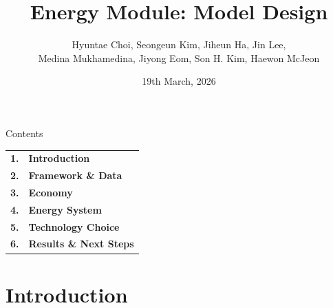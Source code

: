 \documentclass[aspectratio=169, 10pt]{beamer}
\title{Energy Module: Model Design}
\author{Hyuntae Choi, Seongeun Kim, Jiheun Ha, Jin Lee, \\[4pt] Medina Mukhamedina, Jiyong Eom, Son H. Kim, Haewon McJeon\\[12pt]}
\date{19th March, 2026}
\institute{KAIST IAM Group}
\begin{document}
\maketitle

\begin{frame}[t]{Contents}
\vspace{1.2em}
\large
\begin{tabular}{@{} r @{\;\;} l @{}}
  \textbf{1.} & \textbf{\color{gray!70!black}Introduction} \\[1.0em]
  \textbf{2.} & \textbf{\color{green!50!black}Framework \& Data} \\[1.0em]
  \textbf{3.} & \textbf{\color{blue!60}Economy} \\[1.0em]
  \textbf{4.} & \textbf{\color{orange!70}Energy System} \\[1.0em]
  \textbf{5.} & \textbf{\color{purple!60}Technology Choice} \\[1.0em]
  \textbf{6.} & \textbf{\color{yellow!70!black}Results \& Next Steps} \\
\end{tabular}
\end{frame}

\section{Introduction}
\end{document}
